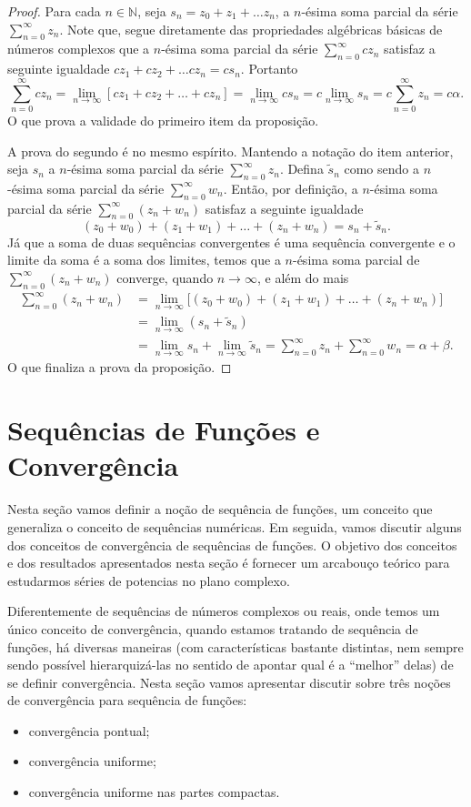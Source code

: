 \begin{proof}
Para cada $n\in\mathbb{N}$, seja $s_n = z_0+z_1+\ldots z_n$, a $n$-ésima soma 
parcial da série $\sum_{n=0}^{\infty} z_n$. Note que, segue 
diretamente das propriedades
algébricas básicas de números complexos que 
a $n$-ésima soma parcial da série $\sum_{n=0}^{\infty} cz_n$ satisfaz a seguinte
igualdade $cz_1+cz_2+\ldots cz_n = cs_n$. Portanto 
\[
\sum_{n=0}^{\infty} cz_n
=
\lim_{n\to\infty} [cz_1+cz_2+\ldots+cz_n]
=
\lim_{n\to\infty} cs_n
=
c\lim_{n\to\infty} s_n
=
c\sum_{n=0}^{\infty} z_n
=
c\alpha.
\]
O que prova a validade do primeiro item da proposição. 

A prova do segundo é no mesmo espírito. Mantendo a notação do item anterior, 
seja $s_n$ a $n$-ésima soma parcial da série $\sum_{n=0}^{\infty}z_n$.
Defina $\widetilde{s}_n$ como sendo a $n$-ésima soma parcial da série
$\sum_{n=0}^{\infty}w_n$. Então, por definição, a $n$-ésima soma parcial da série
$\sum_{n=0}^{\infty}(z_n+w_n)$ satisfaz a seguinte igualdade
\[
(z_0+w_0)+(z_1+w_1)+\ldots+(z_n+w_n) = s_n+\widetilde{s}_n.
\]
Já que a soma de duas sequências convergentes é uma sequência convergente 
e o limite da soma é a soma dos limites, temos que 
a $n$-ésima soma parcial de $\sum_{n=0}^{\infty}(z_n+w_n)$ converge,
quando $n\to\infty$, e além do mais 
\begin{align*}
\sum_{n=0}^{\infty}(z_n+w_n)
&=
\lim_{n\to\infty}
\Big[ (z_0+w_0)+(z_1+w_1)+\ldots+(z_n+w_n) \Big]
\\
&= 
\lim_{n\to\infty}
(s_n+\widetilde{s}_n)
\\
&=
\lim_{n\to\infty}
s_n
+
\lim_{n\to\infty}
\widetilde{s}_n
=
\sum_{n=0}^{\infty}z_n + \sum_{n=0}^{\infty} w_n 
=
\alpha+\beta.
\end{align*}
O que finaliza a prova da proposição.
\end{proof}


\section{Sequências de Funções e Convergência}

Nesta seção vamos definir a noção de sequência de funções, um conceito que
generaliza o conceito de sequências numéricas. Em seguida, vamos discutir
alguns dos conceitos de convergência de sequências de funções. O objetivo
dos conceitos e dos resultados apresentados nesta seção é fornecer um 
arcabouço teórico para estudarmos séries de potencias no plano complexo. 

Diferentemente de sequências de números complexos ou reais, onde
temos um único conceito de convergência, quando
estamos tratando de sequência de funções, há diversas maneiras 
(com características bastante distintas, nem sempre sendo possível 
hierarquizá-las no sentido de apontar qual é a ``melhor'' delas) de 
se definir convergência. Nesta seção vamos apresentar discutir 
sobre três noções de convergência para sequência de funções:
\begin{itemize}
	\item convergência pontual; 
	\item convergência uniforme;
	\item convergência uniforme nas partes compactas.
\end{itemize}

